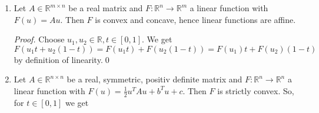     \begin{example} %
    \label{ex:convex_function}

        \begin{enumerate}
            \item Let $A \in \mathbb{R}^{m \times n}$ be a real matrix and $F: \mathbb{R}^{n} \longrightarrow \mathbb{R}^{m}$ a linear function with $F(u) = Au$. Then $F$ is convex and concave, hence linear functions are affine.
                \begin{proof} %
                    Choose $u_{1}, u_{2} \in \mathbb{R}, t \in [0, 1]$. We get
                    $$
                       F(u_{1}t + u_{2}(1 - t)) = F(u_{1}t) + F(u_{2}(1 - t)) = F(u_{1})t + F(u_{2})(1 - t)
                    $$
                    by definition of linearity.\qed
                \end{proof}
            \item Let $A \in \mathbb{R}^{n \times n}$ be a real, symmetric, positiv definite matrix and $F: \mathbb{R}^{n} \longrightarrow \mathbb{R}^{n}$ a linear function with $F(u) = \frac{1}{2}u^{T}Au + b^{T}u + c$. Then $F$ is strictly convex. So, for $t \in [0, 1]$ we get


\end{enumerate}
\end{example}
